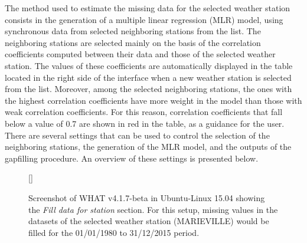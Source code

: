 \documentclass[WHATMANUAL.tex]{subfiles}
\begin{document}
The method used to estimate the missing data for the selected weather station consists in the generation of a multiple linear regression (MLR) model, using synchronous data from selected neighboring stations from the list. The neighboring stations are selected mainly on the basis of the correlation coefficients computed between their data and those of the selected weather station. The values of these coefficients are automatically displayed in the table located in the right side of the interface when a new weather station is selected from the list. Moreover, among the selected neighboring stations, the ones with the highest correlation coefficients have more weight in the model than those with weak correlation coefficients. For this reason, correlation coefficients that fall below a value of 0.7 are shown in red in the table, as a guidance for the user. There are several settings that can be used to control the selection of the neighboring stations, the generation of the MLR model, and the outputs of the gapfilling procedure. An overview of these settings is presented below.

\begin{figure}[!h]
    \setlength{\fboxsep}{0pt}
    [\FBwidth]
	{
	 \caption{Screenshot of WHAT v4.1.7-beta in Ubuntu-Linux 15.04 showing the \emph{Fill data for station} section. For this setup, missing values in the datasets of the selected weather station (MARIEVILLE) would be filled for the 01/01/1980 to 31/12/2015 period.}
	 \label{fig:fill_data_for}
	}
	{
	}
\end{figure}
\end{document}
